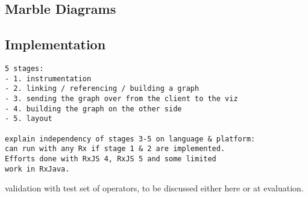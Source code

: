 \subsection{Marble Diagrams}

\subsection{Implementation}
{\color{red}
\begin{verbatim}
5 stages:
- 1. instrumentation
- 2. linking / referencing / building a graph
- 3. sending the graph over from the client to the viz
- 4. building the graph on the other side
- 5. layout

explain independency of stages 3-5 on language & platform: 
can run with any Rx if stage 1 & 2 are implemented. 
Efforts done with RxJS 4, RxJS 5 and some limited 
work in RxJava.
\end{verbatim}
}

validation with test set of operators, to be discussed either here or at evaluation.

